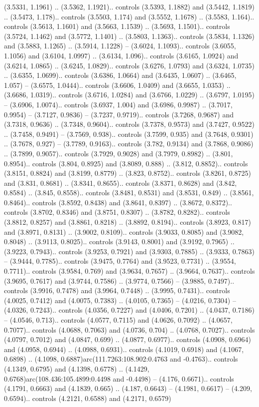 (3.5331, 1.1961) .. (3.5362, 1.1921).. controls (3.5393, 1.1882) and (3.5442, 1.1819) .. (3.5473, 1.178).. controls (3.5503, 1.174) and (3.5552, 1.1678) .. (3.5583, 1.164).. controls (3.5613, 1.1601) and (3.5663, 1.1539) .. (3.5693, 1.1501).. controls (3.5724, 1.1462) and (3.5772, 1.1401) .. (3.5803, 1.1363).. controls (3.5834, 1.1326) and (3.5883, 1.1265) .. (3.5914, 1.1228) -- (3.6024, 1.1093).. controls (3.6055, 1.1056) and (3.6104, 1.0997) .. (3.6134, 1.096).. controls (3.6165, 1.0924) and (3.6214, 1.0865) .. (3.6245, 1.0829).. controls (3.6276, 1.0793) and (3.6324, 1.0735) .. (3.6355, 1.0699).. controls (3.6386, 1.0664) and (3.6435, 1.0607) .. (3.6465, 1.057) -- (3.6575, 1.0444).. controls (3.6606, 1.0409) and (3.6655, 1.0353) .. (3.6686, 1.0319).. controls (3.6716, 1.0284) and (3.6766, 1.0229) .. (3.6797, 1.0195) -- (3.6906, 1.0074).. controls (3.6937, 1.004) and (3.6986, 0.9987) .. (3.7017, 0.9954) -- (3.7127, 0.9836) -- (3.7237, 0.9719).. controls (3.7268, 0.9687) and (3.7318, 0.9636) .. (3.7348, 0.9604).. controls (3.7378, 0.9573) and (3.7427, 0.9522) .. (3.7458, 0.9491) -- (3.7569, 0.938).. controls (3.7599, 0.935) and (3.7648, 0.9301) .. (3.7678, 0.927) -- (3.7789, 0.9163).. controls (3.782, 0.9134) and (3.7868, 0.9086) .. (3.7899, 0.9057).. controls (3.7929, 0.9028) and (3.7979, 0.8982) .. (3.801, 0.8954).. controls (3.804, 0.8925) and (3.8089, 0.888) .. (3.812, 0.8852).. controls (3.8151, 0.8824) and (3.8199, 0.8779) .. (3.823, 0.8752).. controls (3.8261, 0.8725) and (3.831, 0.8681) .. (3.8341, 0.8655).. controls (3.8371, 0.8628) and (3.842, 0.8584) .. (3.845, 0.8558).. controls (3.8481, 0.8531) and (3.8531, 0.849) .. (3.8561, 0.8464).. controls (3.8592, 0.8438) and (3.8641, 0.8397) .. (3.8672, 0.8372).. controls (3.8702, 0.8346) and (3.8751, 0.8307) .. (3.8782, 0.8282).. controls (3.8812, 0.8257) and (3.8861, 0.8218) .. (3.8892, 0.8194).. controls (3.8923, 0.817) and (3.8971, 0.8131) .. (3.9002, 0.8109).. controls (3.9033, 0.8085) and (3.9082, 0.8048) .. (3.9113, 0.8025).. controls (3.9143, 0.8001) and (3.9192, 0.7965) .. (3.9223, 0.7943).. controls (3.9253, 0.7921) and (3.9303, 0.7885) .. (3.9333, 0.7863) -- (3.9444, 0.7785).. controls (3.9475, 0.7764) and (3.9523, 0.7731) .. (3.9554, 0.7711).. controls (3.9584, 0.769) and (3.9634, 0.7657) .. (3.9664, 0.7637).. controls (3.9695, 0.7617) and (3.9744, 0.7586) .. (3.9774, 0.7566) -- (3.9885, 0.7497).. controls (3.9916, 0.7478) and (3.9964, 0.7448) .. (3.9995, 0.7431).. controls (4.0025, 0.7412) and (4.0075, 0.7383) .. (4.0105, 0.7365) -- (4.0216, 0.7304) -- (4.0326, 0.7243).. controls (4.0356, 0.7227) and (4.0406, 0.7201) .. (4.0437, 0.7186) -- (4.0546, 0.713).. controls (4.0577, 0.7115) and (4.0626, 0.7092) .. (4.0657, 0.7077).. controls (4.0688, 0.7063) and (4.0736, 0.704) .. (4.0768, 0.7027).. controls (4.0797, 0.7012) and (4.0847, 0.699) .. (4.0877, 0.6977).. controls (4.0908, 0.6964) and (4.0958, 0.6944) .. (4.0988, 0.6931).. controls (4.1019, 0.6918) and (4.1067, 0.6898) .. (4.1098, 0.6887)arc(111.7263:108.902:0.4763 and -0.4763).. controls (4.1349, 0.6795) and (4.1398, 0.6778) .. (4.1429, 0.6768)arc(108.436:105.4899:0.4498 and -0.4498) -- (4.176, 0.6671).. controls (4.1791, 0.6663) and (4.1839, 0.665) .. (4.187, 0.6643) -- (4.1981, 0.6617) -- (4.209, 0.6594).. controls (4.2121, 0.6588) and (4.2171, 0.6579) 